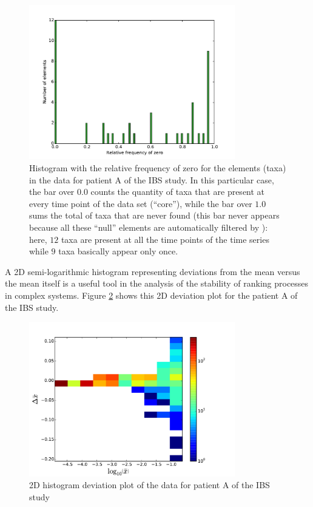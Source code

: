 \begin{figure}
	\centering
	\includegraphics[width=0.8\textwidth]{results/hist/IBS_h_A_amplicons_family_ZRFhist.pdf}
	\caption{Histogram with the relative frequency of zero for the elements (taxa) in the data for patient A of the IBS study\cite{IBS}. In this particular case, the bar over $0.0$ counts the quantity of taxa that are present at every time point of the data set (``core''), while the bar over $1.0$ sums the total of taxa that are never found (this bar never appears because all these ``null'' elements are automatically filtered by \CC): here, $12$ taxa are present at all the time points of the time series while $9$ taxa basically appear only once.}
	\label{fig:histZRF}
\end{figure}

A 2D semi-logarithmic histogram representing deviations from the mean versus the mean itself is a useful tool in the analysis of the stability of ranking processes in complex systems\cite{ranking}. Figure \ref{fig:hist2D} shows this 2D deviation plot for the patient A of the IBS study\cite{IBS}.
 
\begin{figure}
	\centering
	\includegraphics[width=0.8\textwidth]{results/hist/IBS_h_A_amplicons_family_hist2D.pdf}
	\caption{2D histogram deviation plot of the data for patient A of the IBS study\cite{IBS}}
	\label{fig:hist2D}
\end{figure}


